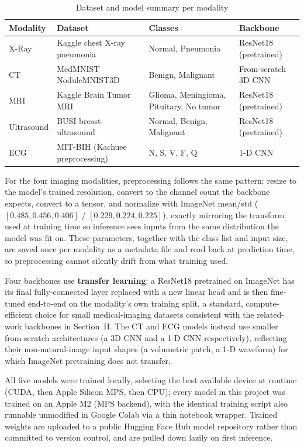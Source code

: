 \documentclass[conference]{IEEEtran}
\begin{document}
\begin{table}[t]
\centering
\caption{Dataset and model summary per modality}
\label{tab:methods}
\footnotesize
\begin{tabular}{@{}p{1.3cm}p{2.0cm}p{1.6cm}p{1.9cm}@{}}
\toprule
\textbf{Modality} & \textbf{Dataset} & \textbf{Classes} & \textbf{Backbone} \\
\midrule
X-Ray & Kaggle chest X-ray pneumonia & Normal, Pneumonia & ResNet18 (pretrained) \\
CT & MedMNIST NoduleMNIST3D & Benign, Malignant & From-scratch 3D CNN \\
MRI & Kaggle Brain Tumor MRI & Glioma, Meningioma, Pituitary, No tumor & ResNet18 (pretrained) \\
Ultrasound & BUSI breast ultrasound & Normal, Benign, Malignant & ResNet18 (pretrained) \\
ECG & MIT-BIH (Kachuee preprocessing) & N, S, V, F, Q & 1-D CNN \\
\bottomrule
\end{tabular}
\end{table}

For the four imaging modalities, preprocessing follows the same pattern: resize to the model's trained resolution, convert to the channel count the backbone expects, convert to a tensor, and normalize with ImageNet mean/std ($[0.485, 0.456, 0.406]$ / $[0.229, 0.224, 0.225]$), exactly mirroring the transform used at training time so inference sees inputs from the same distribution the model was fit on. These parameters, together with the class list and input size, are saved once per modality as a metadata file and read back at prediction time, so preprocessing cannot silently drift from what training used.

Four backbones use \textbf{transfer learning}: a ResNet18 pretrained on ImageNet has its final fully-connected layer replaced with a new linear head and is then fine-tuned end-to-end on the modality's own training split, a standard, compute-efficient choice for small medical-imaging datasets consistent with the related-work backbones in Section~II. The CT and ECG models instead use smaller from-scratch architectures (a 3D CNN and a 1-D CNN respectively), reflecting their non-natural-image input shapes (a volumetric patch, a 1-D waveform) for which ImageNet pretraining does not transfer.

All five models were trained locally, selecting the best available device at runtime (CUDA, then Apple Silicon MPS, then CPU); every model in this project was trained on an Apple M2 (MPS backend), with the identical training script also runnable unmodified in Google Colab via a thin notebook wrapper. Trained weights are uploaded to a public Hugging Face Hub model repository rather than committed to version control, and are pulled down lazily on first inference.
\end{document}
